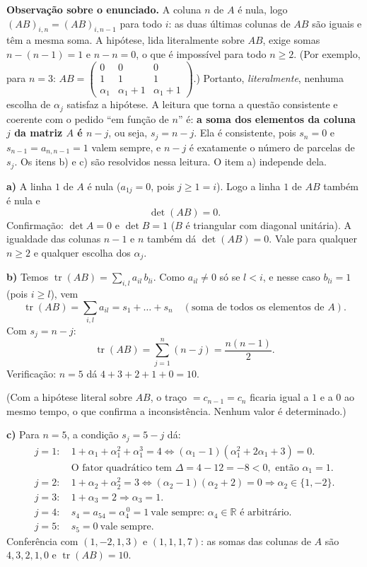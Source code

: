\documentclass{article}%
\begin{document}
\textbf{Observação sobre o enunciado.} A coluna $n$ de $A$ é nula, logo $(AB)_{i,n}=(AB)_{i,n-1}$ para todo $i$: as duas últimas colunas de $AB$ são iguais e têm a mesma soma. A hipótese, lida literalmente sobre $AB$, exige somas $n-(n-1)=1$ e $n-n=0$, o que é impossível para todo $n\ge2$. (Por exemplo, para $n=3$: $AB=\begin{pmatrix}0&0&0\\1&1&1\\ \alpha_1&\alpha_1+1&\alpha_1+1\end{pmatrix}$.) Portanto, \emph{literalmente}, nenhuma escolha de $\alpha_j$ satisfaz a hipótese. A leitura que torna a questão consistente e coerente com o pedido ``em função de $n$'' é: \textbf{a soma dos elementos da coluna $j$ da matriz $A$ é $n-j$}, ou seja, $s_j=n-j$. Ela é consistente, pois $s_n=0$ e $s_{n-1}=a_{n,n-1}=1$ valem sempre, e $n-j$ é exatamente o número de parcelas de $s_j$. Os itens b) e c) são resolvidos nessa leitura. O item a) independe dela.

\textbf{a)} A linha $1$ de $A$ é nula ($a_{1j}=0$, pois $j\ge1=i$). Logo a linha $1$ de $AB$ também é nula e
\[
\det(AB)=0 .
\]
Confirmação: $\det A=0$ e $\det B=1$ ($B$ é triangular com diagonal unitária). A igualdade das colunas $n-1$ e $n$ também dá $\det(AB)=0$. Vale para qualquer $n\ge2$ e qualquer escolha dos $\alpha_j$.

\textbf{b)} Temos $\operatorname{tr}(AB)=\sum_{i,l}a_{il}\,b_{li}$. Como $a_{il}\ne0$ só se $l<i$, e nesse caso $b_{li}=1$ (pois $i\ge l$), vem
\[
\operatorname{tr}(AB)=\sum_{i,l}a_{il}=s_1+\dots+s_n \quad(\text{soma de todos os elementos de }A).
\]
Com $s_j=n-j$:
\[
\operatorname{tr}(AB)=\sum_{j=1}^{n}(n-j)=\frac{n(n-1)}{2}.
\]
Verificação: $n=5$ dá $4+3+2+1+0=10$.

(Com a hipótese literal sobre $AB$, o traço $=c_{n-1}=c_n$ ficaria igual a $1$ e a $0$ ao mesmo tempo, o que confirma a inconsistência. Nenhum valor é determinado.)

\textbf{c)} Para $n=5$, a condição $s_j=5-j$ dá:
\begin{align*}
j=1:&\ 1+\alpha_1+\alpha_1^2+\alpha_1^3=4\iff(\alpha_1-1)(\alpha_1^2+2\alpha_1+3)=0.\\
&\ \text{O fator quadrático tem }\Delta=4-12=-8<0,\text{ então }\alpha_1=1.\\
j=2:&\ 1+\alpha_2+\alpha_2^2=3\iff(\alpha_2-1)(\alpha_2+2)=0\Rightarrow\alpha_2\in\{1,-2\}.\\
j=3:&\ 1+\alpha_3=2\Rightarrow\alpha_3=1.\\
j=4:&\ s_4=a_{54}=\alpha_4^{\,0}=1\ \text{vale sempre: }\alpha_4\in\mathbb{R}\text{ é arbitrário.}\\
j=5:&\ s_5=0\ \text{vale sempre.}
\end{align*}
Conferência com $(1,-2,1,3)$ e $(1,1,1,7)$: as somas das colunas de $A$ são $4,3,2,1,0$ e $\operatorname{tr}(AB)=10$.
\end{document}
